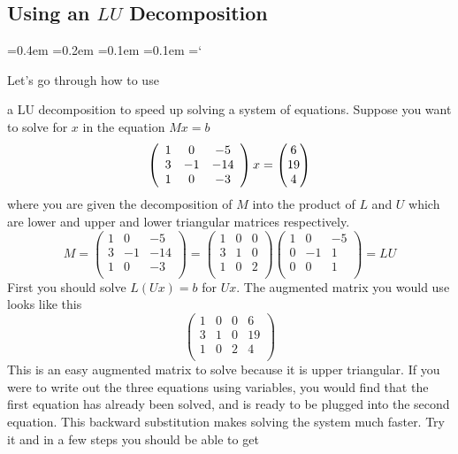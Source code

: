
\subsection*{Using an $LU$ Decomposition}

{\ttfamily
{}\font=0.4em
\font=0.2em
\font=0.1em
\font=0.1em
\hyphenchar\font=`\-


\hypertarget{scripts_lu_decomposition_using_lu_example}{Let's go through how to use} a LU decomposition to speed up solving a system of equations. Suppose you want to solve for $x$ in the equation $Mx=b$
\[
\left( \begin{array}{ccc}
1 & 0 & -5 \\
3 & -1 & -14  \\
 1&  0& -3\\
\end{array} \right) x
= \begin{pmatrix} 6 \\ 19\\ 4 \end{pmatrix}
\]
where you are given the decomposition of $M$ into the product of $L$ and $U$ which are lower and upper and lower triangular matrices respectively.
\[
M =
\left( \begin{array}{ccc}
1 & 0 & -5 \\
3 & -1 & -14  \\
 1&  0& -3\\
\end{array} \right)
=
\left( \begin{array}{ccc}
1 & 0 & 0 \\
3 & 1 &0  \\
 1&  0& 2\\
\end{array} \right)
\left( \begin{array}{ccc}
1 & 0 & -5  \\
0 & -1 &1  \\
0 & 0 & 1\\
\end{array} \right)
=LU
\]
 First you should solve $L(Ux) =b$ for $Ux$. The augmented matrix you would use looks like this 
 \[
 \left( \begin{array}{ccc|c}
1 & 0 & 0 & 6\\
3 & 1 & 0 &19\\
1 & 0 & 2 & 4\\
\end{array} \right)
 \]
 This is an easy augmented matrix to solve because it is upper triangular. If you were to write out the three equations using variables, you would find that the first equation has already been solved, and is ready to be plugged into the second equation. This backward substitution makes solving the system much faster. Try it and in a few steps you should be able to get 
}
